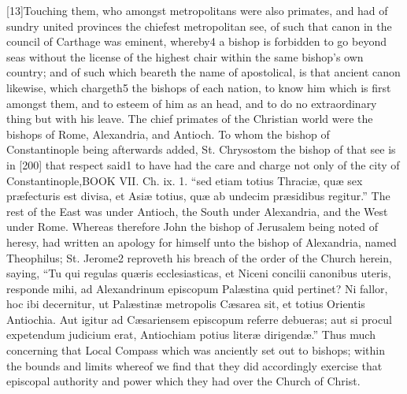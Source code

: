 [13]Touching them, who amongst metropolitans were also primates, and had of sundry united provinces the chiefest metropolitan see, of such that canon in the council of Carthage was eminent, whereby4 a bishop is forbidden to go beyond seas without the license of the highest chair within the same bishop’s own country; and of such which beareth the name of apostolical, is that ancient canon likewise, which chargeth5 the bishops of each nation, to know him which is first amongst them, and to esteem of him as an head, and to do no extraordinary thing but with his leave. The chief primates of the Christian world were the bishops of Rome, Alexandria, and Antioch. To whom the bishop of Constantinople being afterwards added, St. Chrysostom the bishop of that see is in [200] that respect said1 to have had the care and charge not only of the city of Constantinople,BOOK VII. Ch. ix. 1. “sed etiam totius Thraciæ, quæ sex præfecturis est divisa, et Asiæ totius, quæ ab undecim præsidibus regitur.” The rest of the East was under Antioch, the South under Alexandria, and the West under Rome. Whereas therefore John the bishop of Jerusalem being noted of heresy, had written an apology for himself unto the bishop of Alexandria, named Theophilus; St. Jerome2 reproveth his breach of the order of the Church herein, saying, “Tu qui regulas quæris ecclesiasticas, et Niceni concilii canonibus uteris, responde mihi, ad Alexandrinum episcopum Palæstina quid pertinet? Ni fallor, hoc ibi decernitur, ut Palæstinæ metropolis Cæsarea sit, et totius Orientis Antiochia. Aut igitur ad Cæsariensem episcopum referre debueras; aut si procul expetendum judicium erat, Antiochiam potius literæ dirigendæ.” Thus much concerning that Local Compass which was anciently set out to bishops; within the bounds and limits whereof we find that they did accordingly exercise that episcopal authority and power which they had over the Church of Christ.

